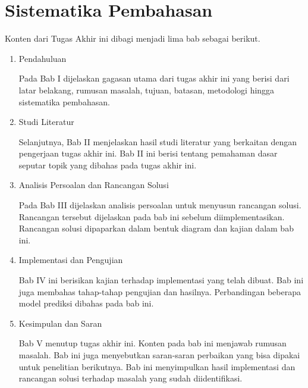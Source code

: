 \section{Sistematika Pembahasan}

Konten dari Tugas Akhir ini  dibagi menjadi lima bab sebagai berikut.
\begin{enumerate}
    \item Pendahuluan

    Pada Bab I  dijelaskan gagasan utama dari tugas akhir ini yang berisi dari latar belakang, rumusan masalah, tujuan, batasan, metodologi hingga sistematika pembahasan.

    \item Studi Literatur

    Selanjutnya, Bab II  menjelaskan hasil studi literatur yang berkaitan dengan pengerjaan tugas akhir ini. Bab II ini berisi tentang pemahaman dasar seputar topik yang  dibahas pada tugas akhir ini.

    \item Analisis Persoalan dan Rancangan Solusi

    Pada Bab III  dijelaskan analisis persoalan untuk menyusun rancangan solusi. Rancangan tersebut  dijelaskan pada bab ini sebelum diimplementasikan. Rancangan solusi  dipaparkan dalam bentuk diagram dan kajian dalam bab ini.

    \item Implementasi dan Pengujian

    Bab IV ini  berisikan kajian terhadap implementasi yang telah dibuat. Bab ini juga  membahas tahap-tahap pengujian dan hasilnya. Perbandingan beberapa model prediksi  dibahas pada bab ini.

    \item Kesimpulan dan Saran

    Bab V  menutup tugas akhir ini. Konten pada bab ini  menjawab rumusan masalah. Bab ini juga  menyebutkan saran-saran perbaikan yang bisa dipakai untuk penelitian berikutnya. Bab ini  menyimpulkan hasil implementasi dan rancangan solusi terhadap masalah yang sudah diidentifikasi.
\end{enumerate}
